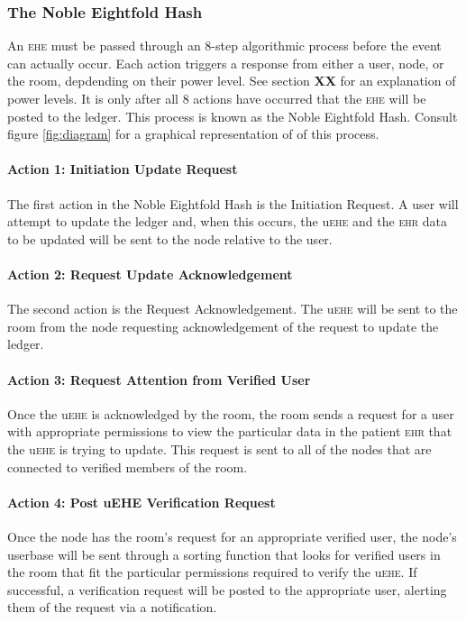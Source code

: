   \subsubsection{The Noble Eightfold Hash}
  An \textsc{ehe} must be passed through an 8-step algorithmic process before the event can actually occur. Each action triggers a response from either a user, node, or the room, depdending on their power level. See section \textbf{XX} for an explanation of power levels. It is only after all 8 actions have occurred that the \textsc{ehe} will be posted to the ledger. This process is known as the Noble Eightfold Hash. Consult figure \ref{fig:diagram} for a graphical representation of of this process.%

    \paragraph{Action 1: Initiation Update Request}
    The first action in the Noble Eightfold Hash is the Initiation Request. A user will attempt to update the ledger and, when this occurs, the u\textsc{ehe} and the \textsc{ehr} data to be updated will be sent to the node relative to the user.%

    \paragraph{Action 2: Request Update Acknowledgement}
    The second action is the Request Acknowledgement. The u\textsc{ehe} will be sent to the room from the node requesting acknowledgement of the request to update the ledger.%

    \paragraph{Action 3: Request Attention from Verified User}
    Once the u\textsc{ehe} is acknowledged by the room, the room sends a request for a user with appropriate permissions to view the particular data in the patient \textsc{ehr} that the u\textsc{ehe} is trying to update. This request is sent to all of the nodes that are connected to verified members of the room.%

    \paragraph{Action 4: Post uEHE Verification Request}
    Once the node has the room's request for an appropriate verified user, the node’s userbase will be sent through a sorting function that looks for verified users in the room that fit the particular permissions required to verify the u\textsc{ehe}. If successful, a verification request will be posted to the appropriate user, alerting them of the request via a notification.%

